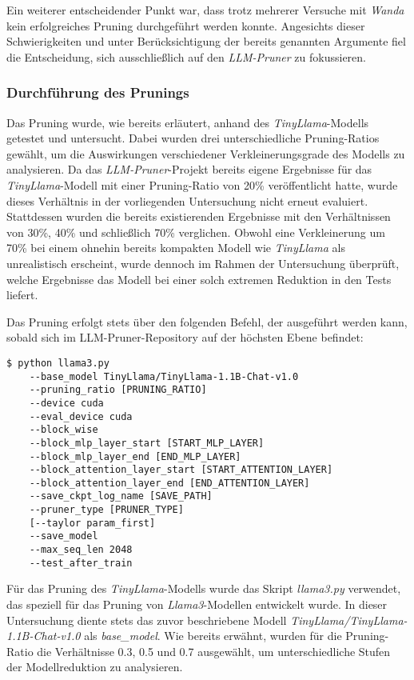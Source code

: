 Ein weiterer entscheidender Punkt war, dass trotz mehrerer Versuche mit
\emph{Wanda} kein erfolgreiches Pruning durchgeführt werden konnte. Angesichts
dieser Schwierigkeiten und unter Berücksichtigung der bereits genannten
Argumente fiel die Entscheidung, sich ausschließlich auf den \emph{LLM-Pruner}
zu fokussieren.

\subsubsection{Durchführung des Prunings}

Das Pruning wurde, wie bereits erläutert, anhand des \emph{TinyLlama}-Modells
getestet und untersucht. Dabei wurden drei unterschiedliche Pruning-Ratios
gewählt, um die Auswirkungen verschiedener Verkleinerungsgrade des Modells zu
analysieren. Da das \emph{LLM-Pruner}-Projekt bereits eigene Ergebnisse für das
\emph{TinyLlama}-Modell mit einer Pruning-Ratio von 20\% veröffentlicht hatte,
wurde dieses Verhältnis in der vorliegenden Untersuchung nicht erneut evaluiert.
Stattdessen wurden die bereits existierenden Ergebnisse mit den Verhältnissen
von 30\%, 40\% und schließlich 70\% verglichen. Obwohl eine Verkleinerung um 70\%
bei einem ohnehin bereits kompakten Modell wie \emph{TinyLlama} als
unrealistisch erscheint, wurde dennoch im Rahmen der Untersuchung überprüft,
welche Ergebnisse das Modell bei einer solch extremen Reduktion in den Tests
liefert.

Das Pruning erfolgt stets über den folgenden Befehl, der ausgeführt werden kann,
sobald sich im LLM-Pruner-Repository auf der höchsten Ebene befindet:

\vspace{1em}
\begin{lstlisting}
$ python llama3.py
    --base_model TinyLlama/TinyLlama-1.1B-Chat-v1.0
    --pruning_ratio [PRUNING_RATIO]
    --device cuda
    --eval_device cuda
    --block_wise
    --block_mlp_layer_start [START_MLP_LAYER]
    --block_mlp_layer_end [END_MLP_LAYER]
    --block_attention_layer_start [START_ATTENTION_LAYER]
    --block_attention_layer_end [END_ATTENTION_LAYER]
    --save_ckpt_log_name [SAVE_PATH]
    --pruner_type [PRUNER_TYPE]
    [--taylor param_first]
    --save_model
    --max_seq_len 2048
    --test_after_train
\end{lstlisting}

Für das Pruning des \emph{TinyLlama}-Modells wurde das Skript \emph{llama3.py}
verwendet, das speziell für das Pruning von \emph{Llama3}-Modellen entwickelt
wurde. In dieser Untersuchung diente stets das zuvor beschriebene Modell
\emph{TinyLlama/TinyLlama-1.1B-Chat-v1.0} als \emph{base\_model}. Wie bereits
erwähnt, wurden für die Pruning-Ratio die Verhältnisse 0.3, 0.5 und 0.7
ausgewählt, um unterschiedliche Stufen der Modellreduktion zu analysieren.

